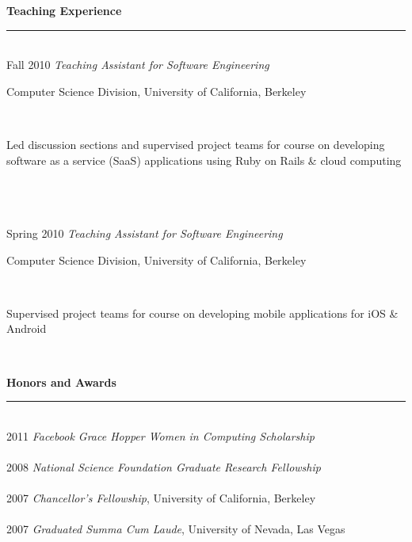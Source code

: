 \documentclass[11pt]{article}
\newcommand{\parwidth}{5.3 in}
\newcommand{\tabwidth}{1.5 in}
\newcommand{\head}[1]{
{\bf #1} \\
\rule{\textwidth}{0.01 in}

\vspace{-0.35 in}

}
\begin{document}
\head{Teaching Experience}

\begin{tabbing}
\hspace{\tabwidth} \= \\

Fall 2010 \> \emph{Teaching Assistant for Software Engineering}\\
\> \parbox[t]{\parwidth}{Computer Science Division, University of California, Berkeley} \\ 
\> \parbox[t]{\parwidth}{Led discussion sections and supervised project teams for course on developing software as a service (SaaS) applications using Ruby on Rails \& cloud computing} \\ \\ \\

Spring 2010 \> \emph{Teaching Assistant for Software Engineering} \\
\> \parbox[t]{\parwidth}{Computer Science Division, University of California, Berkeley} \\ 
\> \parbox[t]{\parwidth}{Supervised project teams for course on developing mobile applications for iOS \& Android} \\ 

\end{tabbing}


\head{Honors and Awards}

\begin{tabbing}
\hspace{\tabwidth} \= \\

2011 \> \emph{Facebook Grace Hopper Women in Computing Scholarship}\\ \\

2008 \> \emph{National Science Foundation Graduate Research Fellowship} \\ \\

2007 \> \emph{Chancellor's Fellowship}, University of California, Berkeley \\ \\

2007 \> \emph{Graduated Summa Cum Laude}, University of Nevada, Las Vegas \\ \\
\end{tabbing}
\end{document}
